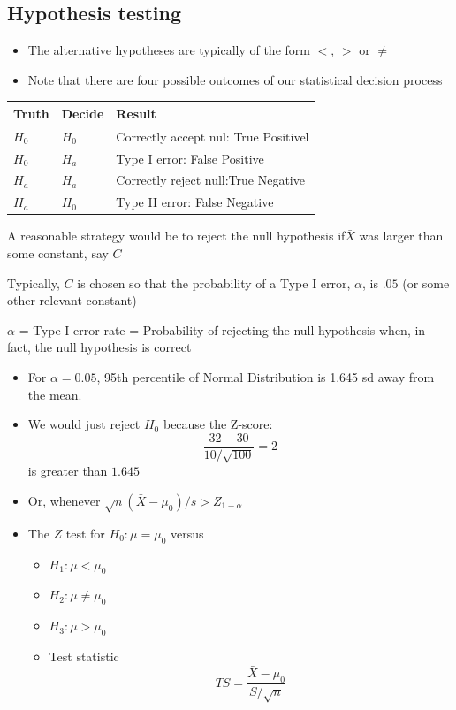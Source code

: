 \documentclass[]{article}
\providecommand{\tightlist}{%
  \setlength{\itemsep}{0pt}\setlength{\parskip}{0pt}}
\begin{document}
\hypertarget{hypothesis-testing-1}{%
\subsection{Hypothesis testing}\label{hypothesis-testing-1}}

\begin{itemize}
\item
  The alternative hypotheses are typically of the form \(<\), \(>\) or
  \(\neq\)
\item
  Note that there are four possible outcomes of our statistical decision
  process
\end{itemize}

\begin{longtable}[]{@{}lll@{}}
\toprule
Truth & Decide & Result\tabularnewline
\midrule
\endhead
\(H_0\) & \(H_0\) & Correctly accept nul: True Positivel\tabularnewline
\(H_0\) & \(H_a\) & Type I error: False Positive\tabularnewline
\(H_a\) & \(H_a\) & Correctly reject null:True Negative\tabularnewline
\(H_a\) & \(H_0\) & Type II error: False Negative\tabularnewline
\bottomrule
\end{longtable}

A reasonable strategy would be to reject the null hypothesis
if\(\bar X\) was larger than some constant, say \(C\)

Typically, \(C\) is chosen so that the probability of a Type I error,
\(\alpha\), is \(.05\) (or some other relevant constant)

\(\alpha\) = Type I error rate = Probability of rejecting the null
hypothesis when, in fact, the null hypothesis is correct

\begin{itemize}
\item
  For \(\alpha=0.05\), 95th percentile of Normal Distribution is 1.645
  sd away from the mean.
\item
  We would just reject \(H_0\) because the Z-score:
  \[\frac{32 - 30}{10 / \sqrt{100}} = 2\] is greater than \(1.645\)
\item
  Or, whenever \(\sqrt{n} (\bar X - \mu_0) / s > Z_{1-\alpha}\)
\item
  The \(Z\) test for \(H_0:\mu = \mu_0\) versus

  \begin{itemize}
  \tightlist
  \item
    \(H_1: \mu < \mu_0\)
  \item
    \(H_2: \mu \neq \mu_0\)
  \item
    \(H_3: \mu > \mu_0\)
  \item
    Test statistic \[TS = \frac{\bar{X} - \mu_0}{S / \sqrt{n}}\]
  \end{itemize}
\end{itemize}
\end{document}
